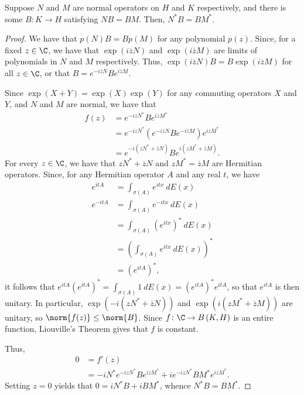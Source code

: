 \documentclass[10pt]{mypackage}
\begin{document}
\begin{theorem}
  Suppose $N$ and $M$ are normal operators on $H$ and $K$ respectively, and there is some $B\colon K\to H$ satisfying $NB = BM$. Then, $N^{\ast}B = BM^{\ast}$.
\end{theorem}
\begin{proof}
  We have that $p(N)B = Bp(M)$ for any polynomial $p(z)$. Since, for a fixed $z\in \C$, we have that $\exp\left( i \overline{z}N \right)$ and $ \exp \left( i \overline{z}M \right) $ are limits of polynomials in $N$ and $M$ respectively. Thus, $\exp\left( i \overline{z}N \right)B = B\exp\left( i \overline{z}M \right)$ for all $z\in \C$, or that $B = e^{-i \overline{z}N}Be^{i \overline{z}M}$.

  Since $\exp\left( X + Y \right) = \exp\left( X \right)\exp\left( Y \right)$ for any commuting operators $X$ and $Y$, and $N$ and $M$ are normal, we have that
  \begin{align*}
    f(z) &= e^{-i z N^{\ast}}B e^{iz M^{\ast}}\\
         &= e^{-iz N^{\ast}} \left( e^{-i \overline{z}N}B e^{-i \overline{z}M} \right) e^{iz M^{\ast}}\\
         &= e^{-i \left( zN^{\ast} + \overline{z}N \right)}B e^{i\left( zM^{\ast} + \overline{z}M \right)}.
  \end{align*}
  For every $z\in \C$, we have that $z N^{\ast} + \overline{z}N$ and $zM^{\ast} = \overline{z}M$ are Hermitian operators. Since, for any Hermitian operator $A$ and any real $t$, we have
  \begin{align*}
    e^{itA} &= \int_{\sigma(A)}^{} e^{itx}\:dE(x)\\
    e^{-itA} &= \int_{\sigma(A)}^{} e^{-itx}\:dE(x)\\
             &= \int_{\sigma(A)}^{} \left( e^{itx} \right)^{\ast}\:dE(x)\\
             &= \left( \int_{\sigma(A)}^{} e^{itx}\:dE(x) \right)^{\ast}\\
             &= \left( e^{itA} \right)^{\ast},
  \end{align*}
  it follows that $e^{itA}\left( e^{itA} \right)^{\ast} = \int_{\sigma(A)}^{} 1\:dE(x) = \left( e^{itA} \right)^{\ast}e^{itA}$, so that $e^{itA}$ is then unitary. In particular, $\exp\left( -i\left( zN^{\ast} + \overline{z}N \right) \right)$ and $\exp\left( i\left( zM^{\ast} + \overline{z}M \right) \right)$ are unitary, so $\norm{f(z)}\leq \norm{B}$. Since $f\colon \C\to B\left( K,H \right)$ is an entire function, Liouville's Theorem gives that $f$ is constant.

  Thus,
  \begin{align*}
    0 &= f'(z)\\
      &= -iN^{\ast}e^{-izN^{\ast}}Be^{izM^{\ast}} + ie^{-izN^{\ast}}BM^{\ast}e^{izM^{\ast}}.
  \end{align*}
  Setting $z = 0$ yields that $0 = iN^{\ast}B + iBM^{\ast}$, whence $N^{\ast}B = BM^{\ast}$.
\end{proof}
\end{document}
